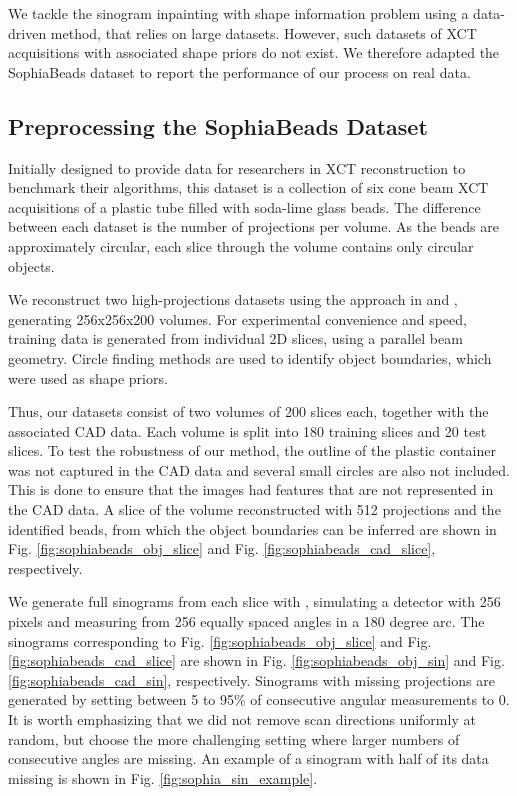 \documentclass[../main.tex]{subfiles}
\begin{document}
We tackle the sinogram inpainting with shape information problem using a data-driven method, that relies on large datasets. However, such datasets of XCT acquisitions with associated shape priors do not exist. We therefore adapted the SophiaBeads \cite{coban2015sophiabeads_dataset} dataset to report the performance of our process on real data. 

\subsection{Preprocessing the SophiaBeads Dataset}
Initially designed to provide data for researchers in XCT reconstruction to benchmark their algorithms, this dataset is a collection of six cone beam XCT acquisitions of a plastic tube filled with soda-lime glass beads. The difference between each dataset is the number of projections per volume. As the beads are approximately circular, each slice through the volume contains only circular objects.

We reconstruct two high-projections datasets using the approach in \cite{coban2015sophiabeads_codes} and \cite{biguri2016tigre}, generating 256x256x200 volumes. For experimental convenience and speed, training data is generated from individual 2D slices, using a parallel beam geometry. Circle finding methods are used to identify object boundaries, which were used as shape priors.  

Thus, our datasets consist of two volumes of 200 slices each, together with the associated CAD data. Each volume is split into 180 training slices and 20 test slices. To test the robustness of our method, the outline of the plastic container was not captured in the CAD data and several small circles are also not included. This is done to ensure that the images had features that are not represented in the CAD data. A slice of the volume reconstructed with 512 projections and the identified beads, from which the object boundaries can be inferred are shown in Fig. \ref{fig:sophiabeads_obj_slice} and Fig. \ref{fig:sophiabeads_cad_slice}, respectively.

We generate full sinograms from each slice with \cite{biguri2016tigre}, simulating a detector with 256 pixels and measuring from 256 equally spaced angles in a 180 degree arc. The sinograms corresponding to Fig. \ref{fig:sophiabeads_obj_slice} and Fig. \ref{fig:sophiabeads_cad_slice} are shown in Fig. \ref{fig:sophiabeads_obj_sin} and Fig. \ref{fig:sophiabeads_cad_sin}, respectively. Sinograms with missing projections are generated by setting between 5 to 95\% of consecutive angular measurements to 0. It is worth emphasizing that we did not remove scan directions uniformly at random, but choose the more challenging setting where larger numbers of consecutive angles are missing. An example of a sinogram with half of its data missing is shown in Fig. \ref{fig:sophia_sin_example}.
\end{document}
